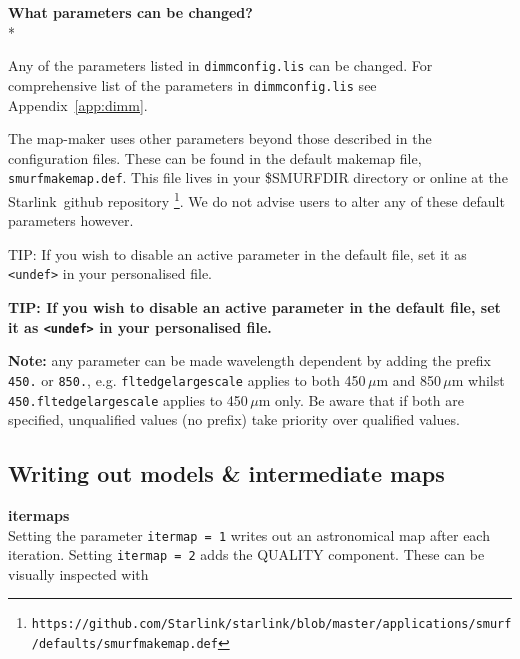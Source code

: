 \documentclass[twoside,11pt]{article}
\newcommand{\htmladdnormallink}[2]{#1}
\newcommand{\htmlref}[2]{#1}
\newenvironment{latexonly}{}{}
\newcommand{\latex}[1]{#1}
\newcommand{\latexhtml}[2]{#1}
\newcommand{\xlabel}[1]{}
\renewcommand{\_}{\texttt{\symbol{95}}}
\newenvironment{fmpage}[1]{\begin{lrbox}{\fmbox}\begin{minipage}{#1}}{\end{minipage}\end{lrbox}\fbox{\usebox{\fmbox}}}
\newcommand{\starlink}{\htmladdnormallink{Starlink}{http://starlink.jach.hawaii.edu}}
\newcommand{\cref}[3]{\latexhtml{#1~\ref{#2}}{\htmlref{#3}{#2}}}
\begin{document}
\textbf{What parameters can be changed?}\\*

Any of the parameters listed in \texttt{dimmconfig.lis} can be
changed. For comprehensive list of the parameters in
\texttt{dimmconfig.lis} see \cref{Appendix}{app:dimm}{an appendix}.

The map-maker uses other parameters beyond those described in the
configuration files. These can be found in the default makemap file,
\texttt{smurf\_makemap.def}. This file lives in your \$SMURF\_DIR directory or
online at the \starlink\ \htmladdnormallink{github
repository}{https://github.com/Starlink/starlink/blob/master/applications/smurf/defaults/smurf\_makemap.def}
\latex{\footnote{\texttt{https://github.com/Starlink/starlink/blob/master/applications/smurf/defaults/smurf\_makemap.def}}}.
We do not advise users to alter any of these default parameters
however.

\begin{latexonly}
\begin{center}
\begin{fmpage}{0.95\linewidth}
\vspace{0.1cm}
TIP: If you wish to disable an active parameter in the default file,
set it as \texttt{<undef>} in your personalised file.
\end{fmpage}
\end{center}
\end{latexonly}

\begin{htmlonly}
\textbf{TIP: If you wish to disable an active parameter in the default
file, set it as \texttt{<undef>} in your personalised file.}
\end{htmlonly}


\textbf{Note:} any parameter can be made wavelength dependent by
adding the prefix \texttt{450.} or \texttt{850.}, e.g.
\texttt{flt\_edge\_largescale} applies to both 450\,$\mu$m and
850\,$\mu$m whilst \texttt{450.flt\_edge\_largescale} applies to
450\,$\mu$m only. Be aware that if both are specified, unqualified
values (no prefix) take priority over qualified values.

\subsection{\xlabel{inter}Writing out models \& intermediate maps}


\textbf{itermaps}\\
Setting the parameter \texttt{itermap~=~1} writes out an astronomical map after each
iteration. Setting \texttt{itermap~=~2} adds the QUALITY component.
These can be visually inspected with
\end{document}
